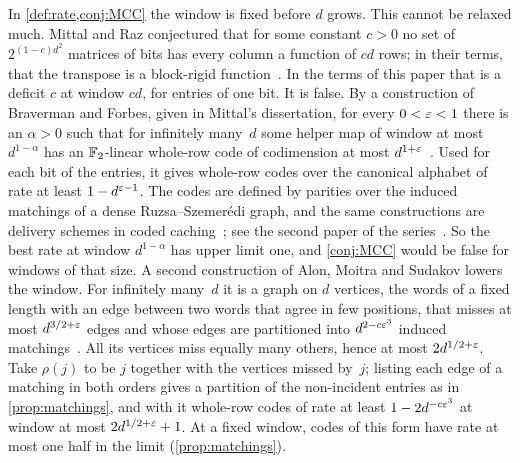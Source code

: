 \begin{remark}\label{rem:growing}
In \cref{def:rate,conj:MCC} the window is fixed before $d$ grows. This cannot be relaxed much. Mittal and Raz
conjectured that for some constant $c>0$ no set of $2^{(1-c)d^2}$ matrices of bits has every column a function of
$cd$ rows; in their terms, that the transpose is a block-rigid function~\cite[Conjecture~36]{MittalRaz2021}. In the
terms of this paper that is a deficit $c$ at window $cd$, for entries of one bit. It is false. By a construction of
Braverman and Forbes, given in Mittal's dissertation, for every $0<\varepsilon<1$ there is an $\alpha>0$ such that for
infinitely many~$d$ some helper map of window at most $d^{1-\alpha}$ has an $\mathbb{F}_2$-linear whole-row code of
codimension at most $d^{1+\varepsilon}$~\cite[Question~10.8.2, Proposition~10.8.3 and Lemma~10.8.5]{Mittal2025}. Used for
each bit of the entries, it gives whole-row codes over the canonical alphabet of rate at least $1-d^{\varepsilon-1}$. The
codes are defined by parities over the induced matchings of a dense Ruzsa--Szemer\'edi graph, and the same
constructions are delivery schemes in coded caching~\cite{ShanmugamEtAl2017,YanEtAl2017}; see the second paper of the
series~\cite{SecondPaper2026}. So the best rate at window $d^{1-\alpha}$ has upper limit one, and \cref{conj:MCC} would be
false for windows of that size. A second construction of Alon, Moitra and Sudakov lowers the window. For
infinitely many~$d$ it is a graph on $d$ vertices, the words of a fixed length with an edge between two words that
agree in few positions, that misses at most $d^{3/2+\varepsilon}$ edges and whose edges are partitioned into
$d^{2-c\varepsilon^3}$ induced matchings~\cite[Claim~2.11, Lemma~2.12, Theorem~2.20 and the paragraph after it]{AMS2013}. All its
vertices miss equally many others, hence at most $2d^{1/2+\varepsilon}$. Take $\rho(j)$ to be $j$ together with the vertices
missed by~$j$; listing each edge of a matching in both orders gives a partition of the non-incident entries as in
\cref{prop:matchings}, and with it whole-row codes of rate at least $1-2d^{-c\varepsilon^3}$ at window at most
$2d^{1/2+\varepsilon}+1$. At a fixed window, codes of this form have rate at most one half in the limit
(\cref{prop:matchings}).
\end{remark}

